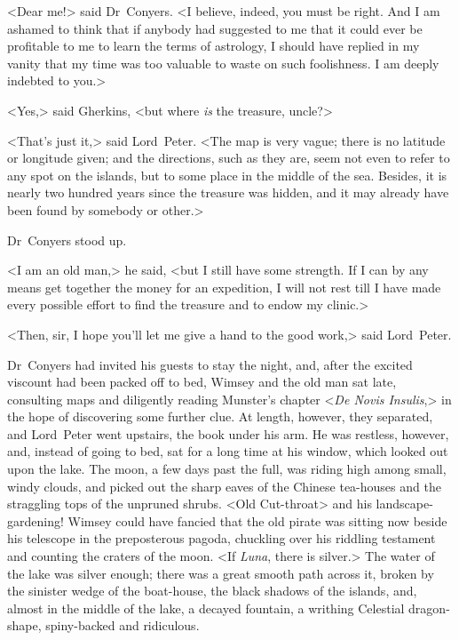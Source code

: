 <Dear me!> said Dr~Conyers. <I believe, indeed, you must be right. And I am ashamed to think that if anybody had suggested to me that it could ever be profitable to me to learn the terms of astrology, I should have replied in my vanity that my time was too valuable to waste on such foolishness. I am deeply indebted to you.>

<Yes,> said Gherkins, <but where \textit{is} the treasure, uncle?>

<That's just it,> said Lord~Peter. <The map is very vague; there is no latitude or longitude given; and the directions, such as they are, seem not even to refer to any spot on the islands, but to some place in the middle of the sea. Besides, it is nearly two hundred years since the treasure was hidden, and it may already have been found by somebody or other.>

Dr~Conyers stood up.

<I am an old man,> he said, <but I still have some strength. If I can by any means get together the money for an expedition, I will not rest till I have made every possible effort to find the treasure and to endow my clinic.>

<Then, sir, I hope you'll let me give a hand to the good work,> said Lord~Peter.

\divider

Dr~Conyers had invited his guests to stay the night, and, after the excited viscount had been packed off to bed, Wimsey and the old man sat late, consulting maps and diligently reading Munster's chapter <\textit{De Novis Insulis},> in the hope of discovering some further clue. At length, however, they separated, and Lord~Peter went upstairs, the book under his arm. He was restless, however, and, instead of going to bed, sat for a long time at his window, which looked out upon the lake. The moon, a few days past the full, was riding high among small, windy clouds, and picked out the sharp eaves of the Chinese tea-houses and the straggling tops of the unpruned shrubs. <Old Cut-throat> and his landscape-gardening! Wimsey could have fancied that the old pirate was sitting now beside his telescope in the preposterous pagoda, chuckling over his riddling testament and counting the craters of the moon. <If \textit{Luna}, there is silver.> The water of the lake was silver enough; there was a great smooth path across it, broken by the sinister wedge of the boat-house, the black shadows of the islands, and, almost in the middle of the lake, a decayed fountain, a writhing Celestial dragon-shape, spiny-backed and ridiculous.

